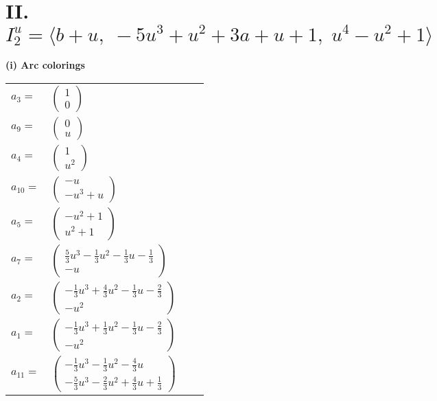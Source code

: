 \documentclass[1p]{elsarticle_modified}
\theoremstyle{definition}
\begin{document}
\centering \section*{II. $I^u_{2}= \langle b+u,\;-5 u^3+u^2+3 a+u+1,\;u^4- u^2+1 \rangle$}
\flushleft \textbf{(i) Arc colorings}\\
\begin{tabular}{m{7pt} m{180pt} m{7pt} m{180pt} }
\flushright $a_{3}=$&$\begin{pmatrix}1\\0\end{pmatrix}$ \\
\flushright $a_{9}=$&$\begin{pmatrix}0\\u\end{pmatrix}$ \\
\flushright $a_{4}=$&$\begin{pmatrix}1\\u^2\end{pmatrix}$ \\
\flushright $a_{10}=$&$\begin{pmatrix}- u\\- u^3+u\end{pmatrix}$ \\
\flushright $a_{5}=$&$\begin{pmatrix}- u^2+1\\u^2+1\end{pmatrix}$ \\
\flushright $a_{7}=$&$\begin{pmatrix}\frac{5}{3} u^3-\frac{1}{3} u^2-\frac{1}{3} u-\frac{1}{3}\\- u\end{pmatrix}$ \\
\flushright $a_{2}=$&$\begin{pmatrix}-\frac{1}{3} u^3+\frac{4}{3} u^2-\frac{1}{3} u-\frac{2}{3}\\- u^2\end{pmatrix}$ \\
\flushright $a_{1}=$&$\begin{pmatrix}-\frac{1}{3} u^3+\frac{1}{3} u^2-\frac{1}{3} u-\frac{2}{3}\\- u^2\end{pmatrix}$ \\
\flushright $a_{11}=$&$\begin{pmatrix}-\frac{1}{3} u^3-\frac{1}{3} u^2-\frac{4}{3} u\\-\frac{5}{3} u^3-\frac{2}{3} u^2+\frac{4}{3} u+\frac{1}{3}\end{pmatrix}$ \\

\end{tabular}
\end{document}
